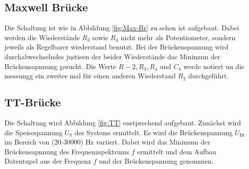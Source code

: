 \subsection{Maxwell Brücke}
Die Schaltung ist wie in Abbildung \ref{fig:Max-Br} zu sehen ist aufgebaut. Dabei werden die Wiederstände $R_3$ sowie $R_4$ nicht mehr als Potentiometer, sondern jeweils als Regelbarer wiederstand benutzt. Bei der Brückenspannung wird durchabwechselndes justieen der beider Wiederstände das Minimum der Brückensapnnung gesucht. Die Werte $R-2, R_3, R_4$ und $C_4$ werde notiert un die messungg ein zweites mal für einen anderen Wiederstand $R_2$ durchgeführt.
\subsection{TT-Brücke}
Die Schaltung wird Abbildung \ref{fig:TT} enstprechend aufgebaut. Zunächst wird die Speisespannung $U_\text{S}$ des Systems ermittelt. Es wird die Brückenspannung $U_\text{Br}$ im Bereich von (20-30000) Hz variiert. Dabei wird das Minimum der Brückensapnnung des Frequenzspektrums $f$ ermittelt und dem Aufbau Datentupel aus der Frequenz $f$ und der Brückenspannung genommen.
